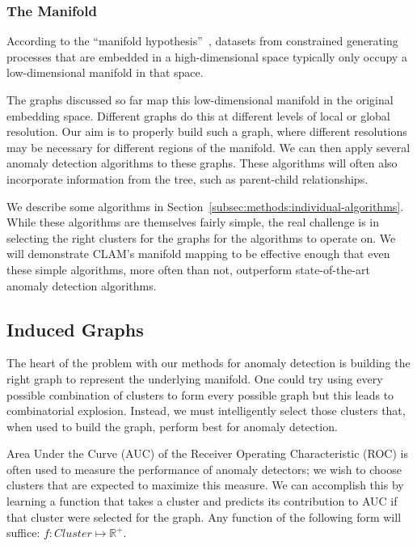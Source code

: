\subsubsection{The Manifold}
According to the ``manifold hypothesis''~\cite{fefferman2016testing},
datasets from constrained generating processes that are embedded in a high-dimensional space typically only occupy a low-dimensional manifold in that space.

The graphs discussed so far map this low-dimensional manifold in the original embedding space.
Different graphs do this at different levels of local or global resolution.
Our aim is to properly build such a graph, where different resolutions may be necessary for different regions of the manifold.
We can then apply several anomaly detection algorithms to these graphs.
These algorithms will often also incorporate information from the tree, such as parent-child relationships.

We describe some algorithms in Section~\ref{subsec:methods:individual-algorithms}.
While these algorithms are themselves fairly simple, the real challenge is in selecting the right clusters for the graphs for the algorithms to operate on.
We will demonstrate CLAM's manifold mapping to be effective enough that even these simple algorithms, more often than not, outperform state-of-the-art anomaly detection algorithms.


\subsection{Induced Graphs}
\label{subsec:methods:induced-graphs}

The heart of the problem with our methods for anomaly detection is building the right graph to represent the underlying manifold.
One could try using every possible combination of clusters to form every possible graph but this leads to combinatorial explosion.
Instead, we must intelligently select those clusters that, when used to build the graph, perform best for anomaly detection.

Area Under the Curve (AUC) of the Receiver Operating Characteristic (ROC) is often used to measure the performance of anomaly detectors;
we wish to choose clusters that are expected to maximize this measure.
We can accomplish this by learning a function that takes a cluster and predicts its contribution to AUC if that cluster were selected for the graph.
Any function of the following form will suffice: $f: Cluster \mapsto \mathbb{R}^+$.

